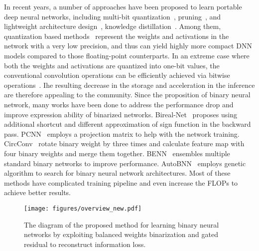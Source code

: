 \documentclass{article}
\begin{document}
In recent years, a number of approaches have been proposed to learn portable deep neural networks, including multi-bit quantization~\cite{google8bit}, pruning~\cite{wang2017towards}, and lightweight architecture design~\cite{zhang2018shufflenet}, knowledge distillation~\cite{zagoruyko2016paying}. Among them, quantization based methods~\cite{google8bit,zhang2018lq} represent the weights and activations in the network with a very low precision, and thus can yield highly more compact DNN models compared to those floating-point counterparts. In an extreme case where both the weights and activations are quantized into one-bit values, the conventional convolution operations can be efficiently achieved via bitwise operations~\cite{rastegari2016xnor}. Ihe resulting decrease in the storage and acceleration in the inference are therefore appealing to the community. Since the proposition of binary neural network, many works have been done to address the performance drop and improve expression ability of binarized networks. Bireal-Net~\cite{bi-real} proposes using additional shortcut and different approximation of sign function in the backward pass. PCNN~\cite{gu2019projection} employs a projection matrix to help with the network training. CircConv~\cite{liu2019circulant} rotate binary weight by three times and calculate feature map with four binary weights and merge them together. BENN~\cite{zhu2019binary} ensembles multiple standard binary networks to improve performance. AutoBNN~\cite{shen2019searching} employs genetic algorithm to search for binary neural network architectures. Most of these methods have complicated training pipeline and even increase the FLOPs to achieve better results.
\begin{figure}
\centering
	\small
	\texttt{[image: figures/overview\_new.pdf]}
	\vspace{-0.2in}
	\caption{The diagram of the proposed method for learning binary neural networks by exploiting balanced weights binarization and gated residual to reconstruct information loss.}
	\label{1}
	\vspace{-0.2in}
\end{figure}
\end{document}
